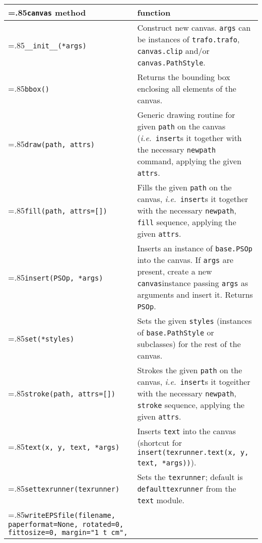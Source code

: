\medskip
\begin{tabularx}
  {\linewidth}
  {>{\hsize=.85\hsize}X>{\raggedright\arraybackslash\hsize=1.15\hsize}X}
  \texttt{canvas} method & function \\
  \hline
  \texttt{\_\_init\_\_(*args)} & Construct new canvas. \texttt{args}
  can be instances of \texttt{trafo.trafo}, \texttt{canvas.clip}
  and/or \texttt{canvas.PathStyle}.\\
  \texttt{bbox()} &
  Returns the bounding box enclosing all elements of the canvas.\\
  \texttt{draw(path, attrs)} &
  Generic drawing routine for given \texttt{path} on the canvas (\textit{i.e.}\
  \texttt{insert}s it together with the necessary \texttt{newpath}
  command, applying the given \texttt{attrs}. \\
  \texttt{fill(path, attrs=[])} &
  Fills the given \texttt{path} on the canvas, \textit{i.e.}\
  \texttt{insert}s it together with the necessary \texttt{newpath},
  \texttt{fill} sequence, applying the given \texttt{attrs}. \\
  \texttt{insert(PSOp, *args)} &
  Inserts an instance of \texttt{base.PSOp} into the canvas.
  If \texttt{args} are present, create a new \texttt{canvas}instance passing
  \texttt{args} as arguments and insert it. Returns \texttt{PSOp}.\\
  \texttt{set(*styles)} &
  Sets the given \texttt{styles} (instances of \texttt{base.PathStyle} or
  subclasses) for the rest of the canvas.\\
  \texttt{stroke(path, attrs=[])} & 
  Strokes the given \texttt{path} on the canvas, \textit{i.e.}\
  \texttt{insert}s it togeither with the necessary \texttt{newpath},
  \texttt{stroke} sequence, applying the given \texttt{attrs}. \\
  \texttt{text(x, y, text, *args)} &
  Inserts \texttt{text} into the
  canvas (shortcut for
  \texttt{insert(texrunner.text(x, y, text, *args))}).\\
  \texttt{settexrunner(texrunner)} &
  Sets the \texttt{texrunner}; default is \texttt{defaulttexrunner}
  from the \texttt{text} module.\\
    \texttt{writeEPSfile(filename, 
      \newline\phantom{writeEPSfile(}paperformat=None, 
      \newline\phantom{writeEPSfile(}rotated=0,
      \newline\phantom{writeEPSfile(}fittosize=0, 
      \newline\phantom{writeEPSfile(}margin="1 t cm",
}
\end{tabularx}
